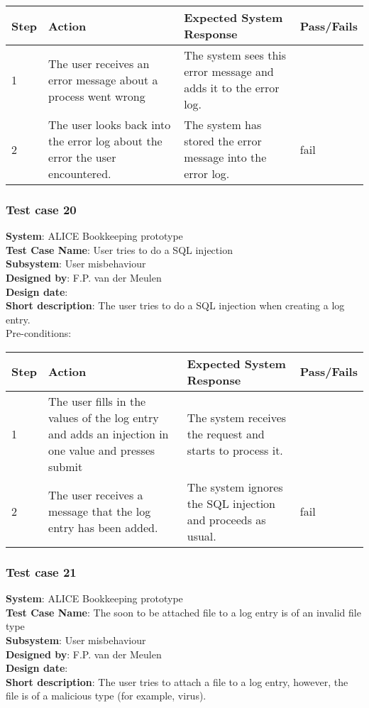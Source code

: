 \begin{longtable}{ | p{0.8cm} | p{4.5cm} | p{6cm} | p{1.5cm} |}
\hline
Step & Action & Expected System Response & Pass/Fails  \\ \hline
1 & The user receives an error message about a process went wrong & The system sees this error message and adds it to the error log. &  \\ \hline
2 & The user looks back into the error log about the error the user encountered. & The system has stored the error message into the error log. & fail\\ \hline
 
\end{longtable}

\subsubsection{Test case 20}
\textbf{System}:  ALICE Bookkeeping prototype \\
\textbf{Test Case Name}:  User tries to do a SQL injection  \\
\textbf{Subsystem}:  User misbehaviour \\
\textbf{Designed by}:  F.P. van der Meulen\\
\textbf{Design date}:  \\
\textbf{Short description}: The user tries to do a SQL injection when creating a log entry. \\

Pre-conditions: \\

\begin{longtable}{ | p{0.8cm} | p{4.5cm} | p{6cm} | p{1.5cm} |}
\hline
Step & Action & Expected System Response & Pass/Fails  \\ \hline
1 & The user fills in the values of the log entry and adds an injection in one value and presses submit & The system receives the request and starts to process it. &  \\ \hline
2 & The user receives a message that the log entry has been added. & The system ignores the SQL injection and proceeds as usual. & fail\\ \hline
 
\end{longtable}

\subsubsection{Test case 21}
\textbf{System}:  ALICE Bookkeeping prototype \\
\textbf{Test Case Name}:  The soon to be attached file to a log entry is of an invalid file type  \\
\textbf{Subsystem}:  User misbehaviour \\
\textbf{Designed by}:  F.P. van der Meulen\\
\textbf{Design date}:  \\
\textbf{Short description}: The user tries to attach a file to a log entry, however, the file is of a malicious type (for example, virus). \\

